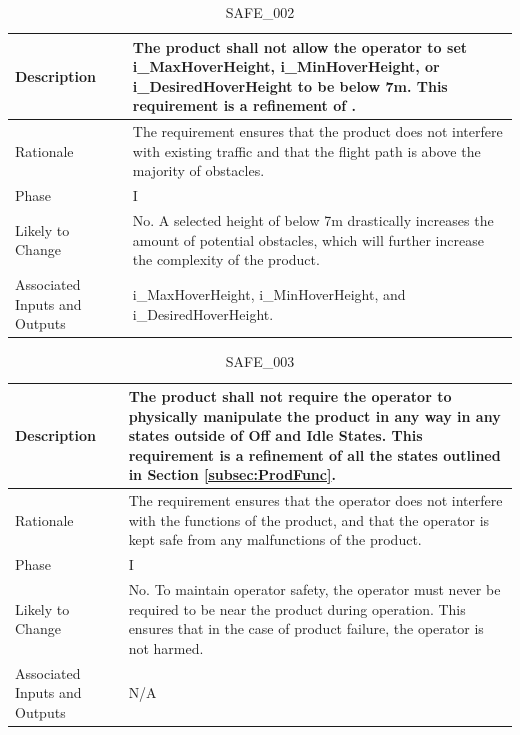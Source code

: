 \documentclass{article}
\begin{document}
\begin{table}[!h]
\begin{center}
\caption {SAFE\_002} 
\label{SAFE_002}
\begin{tabular}{ | m{3cm} | m{11cm} | }
\hline
Description & The product shall not allow the operator to set i\_MaxHoverHeight, i\_MinHoverHeight, or i\_DesiredHoverHeight to be below 7m. This requirement is a refinement of \nameref{SAFE_001}. \\
\hline
Rationale & The requirement ensures that the product does not interfere with existing traffic and that the flight path is above the majority of obstacles.  \\
\hline
Phase & I \\
\hline
Likely to Change & No. A selected height of below 7m drastically increases the amount of potential obstacles, which will further increase the complexity of the product. \\
\hline
Associated Inputs and Outputs & i\_MaxHoverHeight, i\_MinHoverHeight, and i\_DesiredHoverHeight.  \\
\hline
\end{tabular}
\end{center}
\end{table}

\begin{table}[!h]
\begin{center}
\caption {SAFE\_003} 
\label{SAFE_003}
\begin{tabular}{ | m{3cm} | m{11cm} | }
\hline
Description & The product shall not require the operator to physically manipulate the product in any way in any states outside of Off and Idle States. This requirement is a refinement of all the states outlined in Section \ref{subsec:ProdFunc}.  \\
\hline
Rationale & The requirement ensures that the operator does not interfere with the functions of the product, and that the operator is kept safe from any malfunctions of the product.  \\
\hline
Phase & I \\
\hline
Likely to Change & No. To maintain operator safety, the operator must never be required to be near the product during operation. This ensures that in the case of product failure, the operator is not harmed. \\
\hline
Associated Inputs and Outputs & N/A \\
\hline
\end{tabular}
\end{center}
\end{table}
\end{document}
